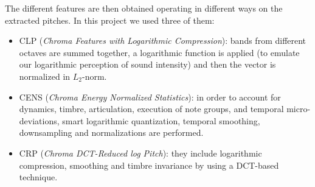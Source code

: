 The different features are then obtained operating in different ways on the extracted pitches. In this project we used three of them:
\begin{itemize}[noitemsep,nolistsep]
	\item CLP (\textit{Chroma Features with Logarithmic Compression}): bands from different octaves are summed together, a logarithmic function is applied (to emulate our logarithmic perception of sound intensity) and then the vector is normalized in $L_2$-norm.
	\item CENS (\textit{Chroma Energy Normalized Statistics}): in order to account for dynamics, timbre, articulation, execution of note groups, and temporal micro-deviations, smart logarithmic quantization, temporal smoothing, downsampling and normalizations are performed.
	\item CRP (\textit{Chroma DCT-Reduced log Pitch}): they include logarithmic compression, smoothing and timbre invariance by using a DCT-based technique.
\end{itemize}